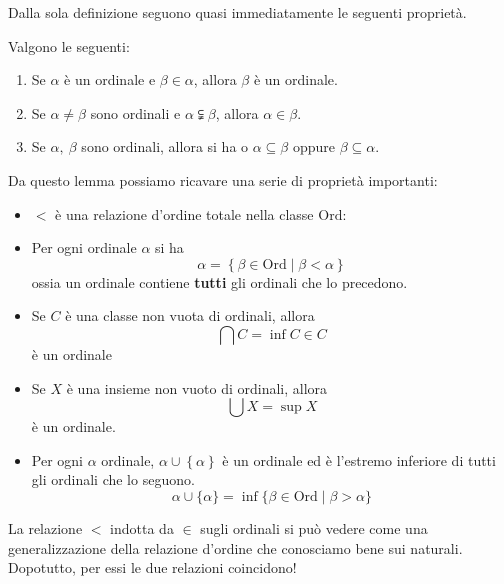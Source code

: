 Dalla sola definizione seguono quasi immediatamente le seguenti proprietà.
\begin{lemmingqed}
	Valgono le seguenti:
\begin{enumerate}
	\item Se $\alpha$ è un ordinale e $\beta\in\alpha$, allora $\beta$ è un ordinale.
	\item Se $\alpha\neq\beta$ sono ordinali e $\alpha\subsetneqq\beta$, allora $\alpha\in\beta$.
	\item Se $\alpha,\ \beta$ sono ordinali, allora si ha o $\alpha\subseteq\beta$ oppure $\beta\subseteq\alpha$.\qedhere
\end{enumerate}
\end{lemmingqed}
Da questo lemma possiamo ricavare una serie di proprietà importanti:
\begin{itemize}
	\item $<$ è una relazione d'ordine totale nella classe $\mathrm{Ord}$:
	\item Per ogni ordinale $\alpha$ si ha
	\begin{equation*}
		\alpha=\left\{\beta\in\mathrm{Ord}\middle|\beta<\alpha\right\}
	\end{equation*}
ossia un ordinale contiene \textbf{tutti} gli ordinali che lo precedono.
\item Se $C$ è una classe non vuota di ordinali, allora
\begin{equation*}
	\bigcap C=\inf C\in C
\end{equation*}
è un ordinale
\item Se $X$ è una insieme non vuoto di ordinali, allora
\begin{equation*}
	\bigcup X=\sup X
\end{equation*}
è un ordinale.
\item Per ogni $\alpha$ ordinale, $\alpha\cup\left\{\alpha\right\}$ è un ordinale ed è l'estremo inferiore di tutti gli ordinali che lo seguono.
\begin{equation*}
		\alpha\cup\{\alpha\}=\inf\{\beta\in\mathrm{Ord}\mid\beta>\alpha\}
\end{equation*}
\end{itemize}
\begin{intuit}
	La relazione $<$ indotta da $\in$ sugli ordinali si può vedere come una generalizzazione della relazione d'ordine che conosciamo bene sui naturali. Dopotutto, per essi le due relazioni coincidono!
\end{intuit}
